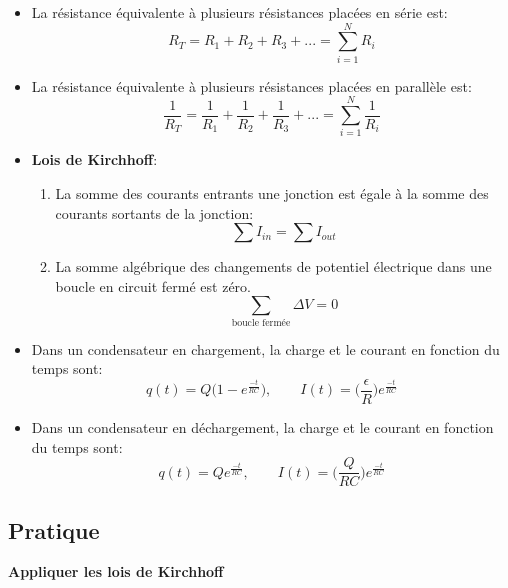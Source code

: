 \documentclass[a4paper]{article}
\begin{document}
\begin{itemize}
    \item La résistance équivalente à plusieurs résistances placées en série est: 
\[ R_T = R_1 + R_2 + R_3 + ... = \sum_{i=1}^{N} R_i \]
    \item La résistance équivalente à plusieurs résistances placées en parallèle est: 
\[ \frac{1}{R_T} = \frac{1}{R_1} + \frac{1}{R_2} + \frac{1}{R_3} + ... = \sum_{i=1}^{N} \frac{1}{R_i} \]
    \item \textbf{Lois de Kirchhoff}: 
    \begin{enumerate}
        \item La somme des courants entrants une jonction est égale à la somme des courants sortants de la jonction: 
        \[ \sum I_{in} = \sum I_{out} \]
        \item La somme algébrique des changements de potentiel électrique dans une boucle en circuit fermé est zéro. 
        \[ \sum_{\text{boucle fermée}} \Delta V = 0 \]
    \end{enumerate}
    \item Dans un condensateur en chargement, la charge et le courant en fonction du temps sont: 
\[ q(t) = Q \Big( 1 - e^{\frac{-t}{RC}} \Big), \qquad I(t) = \Big( \frac{\epsilon}{R} \Big) e^{\frac{-t}{RC}} \]
    \item  Dans un condensateur en déchargement, la charge et le courant en fonction du temps sont: 
\[ q(t) = Q e^{\frac{-t}{RC}}, \qquad I(t) = \Big( \frac{Q}{RC} \Big) e^{\frac{-t}{RC}} \]
\end{itemize}








\subsection{Pratique}






\textbf{Appliquer les lois de Kirchhoff}
\end{document}
